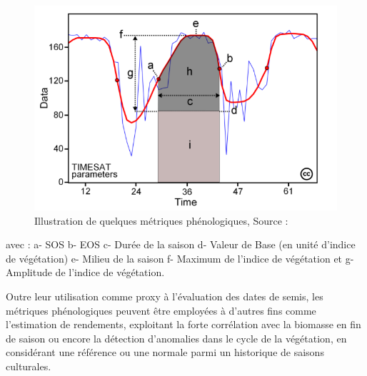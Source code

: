 \begin{figure}[htbp]
 \begin{center}
  \includegraphics[scale=0.45]{synthese_biblio/metrics.png} 
 \end{center}
 \caption{Illustration de quelques métriques phénologiques, Source : \citet{Eklundh2017}}
 \label{metrics}
\end{figure}
\vspace{5mm}
avec : a- SOS b- EOS c- Durée de la saison d- Valeur de Base (en unité d'indice de végétation) e- Milieu de la saison f- Maximum de l'indice de végétation et g- Amplitude de l'indice de végétation.

\vspace{5mm}

Outre leur utilisation comme proxy à l'évaluation des dates de semis, les métriques phénologiques peuvent être employées à d'autres fins comme l'estimation de rendements, exploitant 
la forte corrélation avec la biomasse en fin de saison ou encore la détection d'anomalies dans le cycle de la végétation, en considérant une référence ou une normale parmi un 
historique de saisons culturales.

\vspace{5mm}

